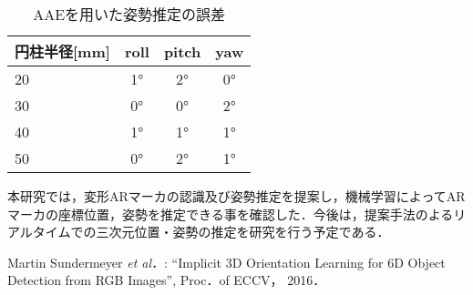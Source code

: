 \documentclass{jsarticle}
\begin{document}
\begin{table}[h]
        \vspace{-1.8zh}
          \begin{center}
            \caption{AAEを用いた姿勢推定の誤差}
            \label{hyouka}
            \begin{tabular}{l|c|c|c} \hline
              円柱半径[mm]   & roll& pitch & yaw \\ \hline
 20  & 1° & 2° & 0° \\ \hline
              30  & 0° & 0° & 2° \\ \hline
              40  & 1° & 1° & 1° \\ \hline
              50  & 0°& 2° & 1° \\ \hline
              \end{tabular}
          \end{center}
        \vspace{-1.0zh}
\end{table}





本研究では，変形ARマーカの認識及び姿勢推定を提案し，機械学習によってARマーカの座標位置，姿勢を推定できる事を確認した．今後は，提案手法のよるリアルタイムでの三次元位置・姿勢の推定を研究を行う予定である．

%
%
%

\begin{thebibliography}{1}

{\scriptsize 
{}
Martin Sundermeyer {\em et al．}: ``Implicit 3D Orientation Learning for 6D Object Detection from RGB Images'', 
Proc．of ECCV， 2016．}

\end{thebibliography}
\end{document}
